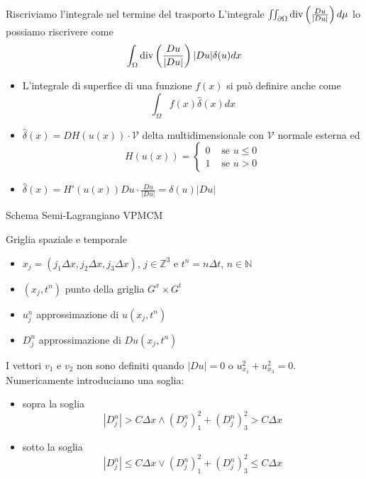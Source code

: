 \begin{frame}{Riscriviamo l'integrale nel termine del trasporto}
     L'integrale
    $\iint_{\partial\Omega}\operatorname{div}\left(\frac{Du}{|Du|}\right)d\mu$ lo
    possiamo riscrivere come
    \[
    \int_{\Omega}\operatorname{div}\left(\frac{Du}{|Du|}\right)|Du|\delta(u)dx
    \]
    \begin{itemize}
    \item L'integrale di superfice di una funzione $f(x)$ si può
      definire anche come 
      \[
      \int_{\Omega}f(x)\hat{\delta}(x)dx
      \]   
    \item $\hat{\delta}(x)=DH(u(x))\cdot\mathcal{V}$ delta
      multidimensionale con $\mathcal{V}$ normale esterna ed 
      \[
      H(u(x))=
      \begin{cases}
        0 &\text{ se }u\leq 0 \\
        1 &\text{ se }u > 0
      \end{cases}
      \]
    \item $\hat{\delta}(x)=H'(u(x))Du\cdot\frac{Du}{|Du|}=\delta(u)|Du|$
    \end{itemize}
 \end{frame}

\begin{frame}{Schema Semi-Lagrangiano VPMCM}
  \begin{block}{Griglia spaziale e temporale}
    \begin{itemize}
      \item $x_j=(j_1\Delta x,j_2\Delta x,j_3\Delta x)$,
        $j\in\mathbb{Z}^3$ e $t^n=n\Delta t$, $n\in\mathbb{N}$
      \item $(x_j,t^n)$ punto della griglia $G^x\times G^t$
      \item $u_j^n$ approssimazione di $u(x_j,t^n)$
      \item $D_j^n$ approssimazione di $Du(x_j,t^n)$
    \end{itemize}
    \end{block}
  \begin{osservazione}
    I vettori $v_1$ e $v_2$ non sono definiti quando $|Du|=0$ o
    $u_{x_1}^2+u_{x_3}^2=0$. Numericamente introduciamo una soglia:
    \begin{itemize}
    \item \alert{sopra la soglia}
      \[
      |D_j^n|>C\Delta x \land (D_j^n)_1^2+(D_j^n)_3^2>C\Delta x
      \]
    \item \alert{sotto la soglia}
      \[
      |D_j^n|\leq C\Delta x \lor (D_j^n)_1^2+(D_j^n)_3^2\leq C\Delta x
      \]
      \end{itemize}
    \end{osservazione}
\end{frame}

